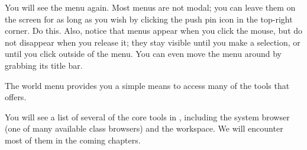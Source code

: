 \documentclass[a4paper,10pt,twoside]{book}
\begin{document}
You will see the  menu again.
Most \sq menus are not modal; you can leave them on the screen for as long as you wish by clicking the push pin icon in the top-right corner. Do this. Also, notice that menus appear when you click the mouse, but do not disappear when you release it; they stay visible until you make a selection, or until you click outside of the menu. You can even move the menu around by grabbing its title bar.

The world menu provides you a simple means to access many of the tools that \sq offers.

You will see a list of several of the core tools in \sq, including the system browser (one of many available class browsers) and the workspace.
We will encounter most of them in the coming chapters.
\end{document}
